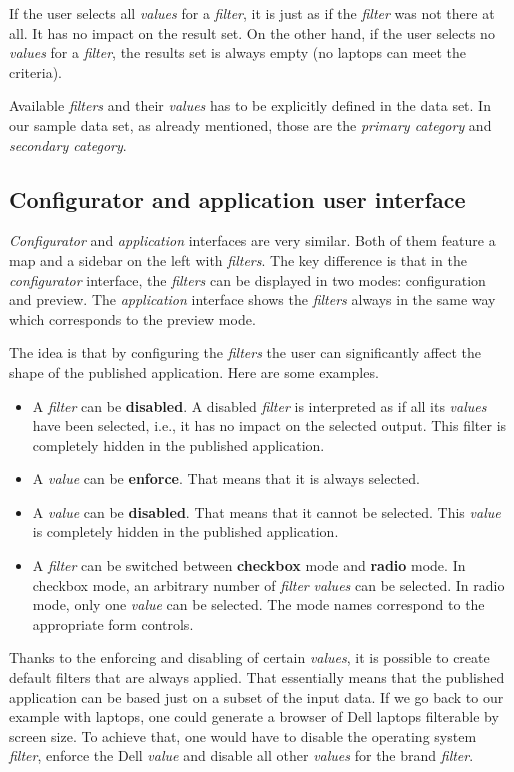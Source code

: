 If the user selects all \emph{values} for a \emph{filter}, it is just as if the \emph{filter} was not there at all. It has no impact on the result set. On the other hand, if the user selects no \emph{values} for a \emph{filter}, the results set is always empty (no laptops can meet the criteria).

Available \emph{filters} and their \emph{values} has to be explicitly defined in the data set. In our sample data set, as already mentioned, those are the \emph{primary category} and \emph{secondary category}.

\subsection{Configurator and application user interface}

\emph{Configurator} and \emph{application} interfaces are very similar. Both of them feature a map and a sidebar on the left with \emph{filters}. The key difference is that in the \emph{configurator} interface, the \emph{filters} can be displayed in two modes: configuration and preview. The \emph{application} interface shows the \emph{filters} always in the same way which corresponds to the preview mode.

The idea is that by configuring the \emph{filters} the user can significantly affect the shape of the published application. Here are some examples.

\begin{itemize}
\item A \emph{filter} can be \textbf{disabled}. A disabled \emph{filter} is interpreted as if all its \emph{values} have been selected, i.e., it has no impact on the selected output. This filter is completely hidden in the published application.
\item A \emph{value} can be \textbf{enforce}. That means that it is always selected.
\item A \emph{value} can be \textbf{disabled}. That means that it cannot be selected. This \emph{value} is completely hidden in the published application.
\item A \emph{filter} can be switched between \textbf{checkbox} mode and \textbf{radio} mode. In checkbox mode, an arbitrary number of \emph{filter} \emph{values} can be selected. In radio mode, only one \emph{value} can be selected. The mode names correspond to the appropriate form controls.

\end{itemize}
Thanks to the enforcing and disabling of certain \emph{values}, it is possible to create default filters that are always applied. That essentially means that the published application can be based just on a subset of the input data. If we go back to our example with laptops, one could generate a browser of Dell laptops filterable by screen size. To achieve that, one would have to disable the operating system \emph{filter}, enforce the Dell \emph{value} and disable all other \emph{values} for the brand \emph{filter}.

